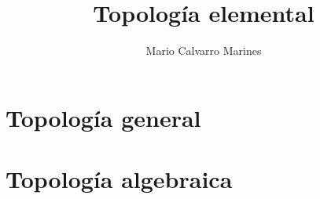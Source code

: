 \documentclass[10pt,a4paper,openright]{book}
\title{Topología elemental}
\author{Mario Calvarro Marines}
\date{}
\begin{document}
\frontmatter
\maketitle
\setcounter{tocdepth}{3}%
\tableofcontents


\mainmatter
\part{Topología general}









\part{Topología algebraica}






\end{document}
